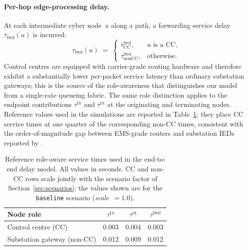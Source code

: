 \paragraph{Per-hop edge-processing delay.}
At each intermediate cyber node~$u$ along a path, a forwarding
service delay~$\tau_{\text{fwd}}(u)$ is incurred:
\begin{equation}\label{eq:fwd}
  \tau_{\text{fwd}}(u) \;=\;
  \begin{cases}
    \tau_{\text{CC}}^{\text{fwd}},   & u\text{ is a CC},\\[2pt]
    \tau_{\text{nonCC}}^{\text{fwd}},& \text{otherwise}.
  \end{cases}
\end{equation}
Control centres are equipped with carrier-grade routing hardware
and therefore exhibit a substantially lower per-packet service
latency than ordinary substation gateways; this is the source of
the role-awareness that distinguishes our model from a single-rate
queueing fabric.  The same role distinction applies to the
endpoint contributions $\tau^{\text{tx}}$ and $\tau^{\text{rx}}$ at
the originating and terminating nodes.  Reference values used in
the simulations are reported in Table~\ref{tab:service_times};
they place CC service times at one quarter of the corresponding
non-CC times, consistent with the order-of-magnitude gap between
EMS-grade routers and substation IEDs reported by
\citep{NASPI_LatencyGuidelines}.

\begin{table}[t]
  \centering
  \caption{Reference role-aware service times used in the
    end-to-end delay model.  All values in seconds.  CC and non-CC
    rows scale jointly with the scenario factor of
    Section~\ref{sec:scenarios}; the values shown are for the
    \texttt{baseline} scenario (\textit{scale}~$=1.0$).}
  \label{tab:service_times}
  \small
  \begin{tabular}{@{}lccc@{}}
    \toprule
    Node role & $\tau^{\text{tx}}$ & $\tau^{\text{rx}}$ &
                $\tau^{\text{fwd}}$\\
    \midrule
    Control centre (CC)         & 0.003 & 0.004 & 0.003\\
    Substation gateway (non-CC) & 0.012 & 0.009 & 0.012\\
    \bottomrule
  \end{tabular}
\end{table}

